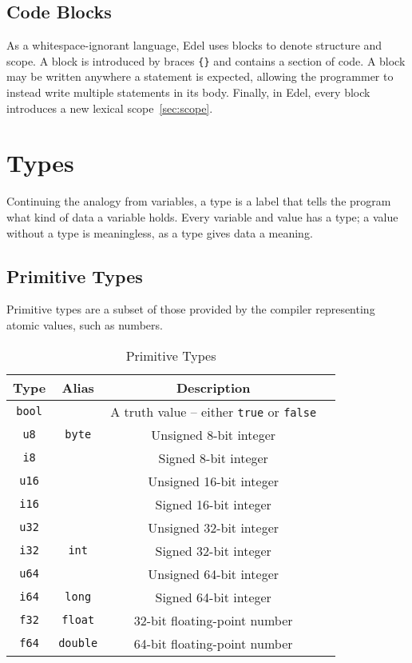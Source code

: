 \documentclass{article}
\begin{document}
    \subsection{Code Blocks}\label{subsec:code-blocks}

    As a whitespace-ignorant language, Edel uses blocks to denote structure and scope.
    A block is introduced by braces \texttt{\{\}} and contains a section of code.
    A block may be written anywhere a statement is expected, allowing the programmer to instead write multiple statements in its body.
    Finally, in Edel, every block introduces a new lexical scope~\ref{sec:scope}.

    \section{Types}\label{sec:types}

    Continuing the analogy from variables, a type is a label that tells the program what kind of data a variable holds.
    Every variable and value has a type; a value without a type is meaningless, as a type gives data a meaning.

    \subsection{Primitive Types}

    Primitive types are a subset of those provided by the compiler representing atomic values, such as numbers.

    \medskip
    \begin{table}[H]
        \centering
        \begin{tabular}{|c|c|c|l|}
            \hline
            \textbf{Type} & \textbf{Alias} & \textbf{Description} \\
            \hline
            \texttt{bool} & & A truth value -- either \texttt{true} or \texttt{false} \\
            \hline
            \texttt{u8} & \texttt{byte} & Unsigned 8-bit integer \\
            \texttt{i8} & & Signed 8-bit integer \\
            \hline
            \texttt{u16} & & Unsigned 16-bit integer \\
            \texttt{i16} & & Signed 16-bit integer \\
            \hline
            \texttt{u32} & & Unsigned 32-bit integer \\
            \texttt{i32} & \texttt{int} & Signed 32-bit integer \\
            \hline
            \texttt{u64} & & Unsigned 64-bit integer \\
            \texttt{i64} & \texttt{long} & Signed 64-bit integer \\
            \hline
            \texttt{f32} & \texttt{float} & 32-bit floating-point number \\
            \texttt{f64} & \texttt{double} & 64-bit floating-point number \\
            \hline
        \end{tabular}
        \caption{Primitive Types}\label{tab:primitive-types}
    \end{table}
\end{document}

